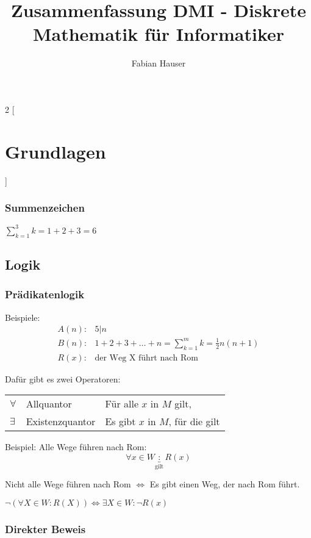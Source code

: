 

\title{Zusammenfassung DMI - Diskrete Mathematik für Informatiker}
\author{Fabian Hauser}
 

\maketitle
\begin{multicols}{2}
[
\section{Grundlagen}
]

\subsubsection{Summenzeichen}

$ \sum_{k=1}^{3} k = 1+2+3 = 6$

\subsection{Logik}

\subsubsection{Prädikatenlogik}
Beispiele:
\begin{align*}
A(n): & 5 | n \\
B(n): & 1+2+3+\dots+n = \sum_{k=1}^{m}k = \frac{1}{2} n (n+1) \\
R(x): & \text{der Weg X führt nach Rom}
\end{align*}

Dafür gibt es zwei Operatoren:

\begin{tabular}{l l l}
$\forall$ & Allquantor & Für alle $x$ in $M$ gilt, \\
$\exists$ & Existenzquantor &
Es gibt $x$ in $M$, für die gilt
\end{tabular}

Beispiel: Alle Wege führen nach Rom:
\[
\forall x \in W \underbracket{:}_\text{gilt} R(x)
\]

Nicht alle Wege führen nach Rom $\Leftrightarrow$ Es gibt einen Weg, der nach Rom führt.

$\neg \left(\forall X \in W : R\left(X\right)\right) \Leftrightarrow \exists X \in W : \neg R(x)$




\subsubsection{Direkter Beweis}

\end{multicols}



